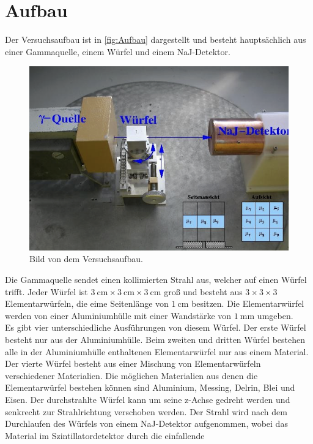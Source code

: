 \section{Aufbau}
\label{sec:Aufbau}
Der Versuchsaufbau ist in \autoref{fig:Aufbau} dargestellt und besteht hauptsächlich aus einer Gammaquelle, einem Würfel und einem NaJ-Detektor.
\begin{figure}[H]
    \centering
    \includegraphics[scale=0.7]{Abbildungen/Aufbau.png}
    \caption{Bild von dem Versuchsaufbau.\cite{V14}}
    \label{fig:Aufbau}
\end{figure}
Die Gammaquelle sendet einen kollimierten Strahl aus, welcher auf einen Würfel trifft. 
Jeder Würfel ist $\qty{3}{\centi\meter} \times \qty{3}{\centi\meter} \times \qty{3}{\centi\meter}$ groß und besteht aus $3 \times 3 \times 3$
Elementarwürfeln, die eime Seitenlänge von $\qty{1}{\centi\meter}$ besitzen. Die Elementarwürfel werden von einer Aluminiumhülle mit einer
Wandstärke von $\qty{1}{\milli\meter}$ umgeben.\\
Es gibt vier unterschiedliche Ausführungen von diesem Würfel. Der erste Würfel besteht nur aus der Aluminiumhülle.
Beim zweiten und dritten Würfel bestehen alle in der Aluminiumhülle enthaltenen Elementarwürfel nur aus einem Material. Der vierte Würfel besteht aus
einer Mischung von Elementarwürfeln verschiedener Materialien.
Die möglichen Materialien aus denen die Elementarwürfel bestehen können sind Aluminium, Messing, Delrin, Blei und Eisen.
Der durchstrahlte Würfel kann um seine z-Achse gedreht werden und senkrecht zur Strahlrichtung verschoben werden.
Der Strahl wird nach dem Durchlaufen des Würfels von einem NaJ-Detektor aufgenommen, wobei das Material im Szintillatordetektor durch die einfallende
